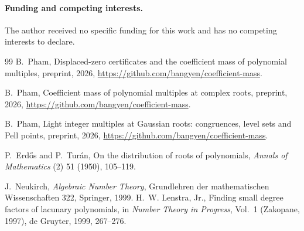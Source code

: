 \documentclass[11pt]{article}
\begin{document}
\paragraph{Funding and competing interests.}
The author received no specific funding for this work and has no competing
interests to declare.

\begin{thebibliography}{99}
\small
{}
B.~Pham,
\newblock Displaced-zero certificates and the coefficient mass of polynomial
multiples,
\newblock preprint, 2026, \url{https://github.com/bangyen/coefficient-mass}.

B.~Pham,
\newblock Coefficient mass of polynomial multiples at complex roots,
\newblock preprint, 2026, \url{https://github.com/bangyen/coefficient-mass}.

B.~Pham,
\newblock Light integer multiples at Gaussian roots: congruences, level
sets and Pell points,
\newblock preprint, 2026, \url{https://github.com/bangyen/coefficient-mass}.

P.~Erd\H{o}s and P.~Tur\'an,
\newblock On the distribution of roots of polynomials,
\newblock \emph{Annals of Mathematics} (2) 51 (1950), 105--119.

J.~Neukirch,
\newblock \emph{Algebraic Number Theory},
\newblock Grundlehren der mathematischen Wissenschaften 322, Springer, 1999.
H.~W. Lenstra, Jr.,
\newblock Finding small degree factors of lacunary polynomials,
\newblock in \emph{Number Theory in Progress}, Vol.~1 (Zakopane, 1997),
de Gruyter, 1999, 267--276.

\end{thebibliography}
\end{document}
